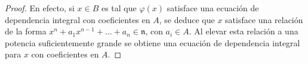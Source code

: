 \begin{proof}
En efecto, si $x\in B$ es tal que $\varphi(x)$ satisface una
ecuación de dependencia integral con coeficientes en $A$, se deduce
que $x$ satisface una relación de la forma
$x^n+a_1x^{n-1}+\ldots+a_n\in\mathfrak n$, con $a_i\in A$.
Al elevar esta relación a una potencia suficientemente grande se
obtiene una ecuación de dependencia integral para $x$ con
coeficientes en $A$.
\end{proof}

